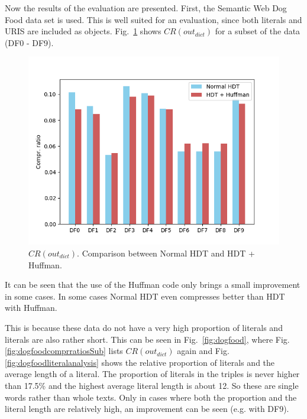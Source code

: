 Now the results of the evaluation are presented. First, the Semantic Web Dog Food data set is used. This is well suited for an evaluation, since both literals and URIS are included as objects. Fig.~\ref{fig:dogfoodcomprratios} shows $CR(out_{dict})$ for a subset of the data (DF0 - DF9). 


\begin{figure}
	\centering
	\includegraphics[width=0.7\linewidth]{figures/4_evaluation/dogFoodComprRatios}
	\caption{$CR(out_{dict})$. Comparison between Normal HDT and HDT + Huffman.}
	\label{fig:dogfoodcomprratios}
\end{figure}

It can be seen that the use of the Huffman code only brings a small improvement in some cases. In some cases Normal HDT even compresses better than HDT with Huffman.

This is because these data do not have a very high proportion of literals and literals are also rather short. This can be seen in Fig.~\ref{fig:dogfood}, where Fig.\ref{fig:dogfoodcomprratiosSub} lists $CR(out_{dict})$ again and Fig.\ref{fig:dogfoodliteralanalysis} shows the relative proportion of literals and the average length of a literal. The proportion of literals in the triples is never higher than 17.5\% and the highest average literal length is about 12. So these are single words rather than whole texts. Only in cases where both the proportion and the literal length are relatively high, an improvement can be seen (e.g. with DF9).


